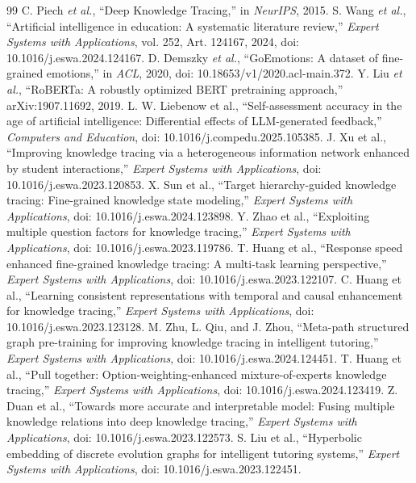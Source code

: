 \documentclass[conference]{IEEEtran}
\begin{document}
\begin{thebibliography}{99}
 C. Piech \emph{et al.}, ``Deep Knowledge Tracing,'' in \emph{NeurIPS}, 2015.
 S. Wang \emph{et al.}, ``Artificial intelligence in education: A systematic literature review,'' \emph{Expert Systems with Applications}, vol. 252, Art. 124167, 2024, doi: 10.1016/j.eswa.2024.124167.
 D. Demszky \emph{et al.}, ``GoEmotions: A dataset of fine-grained emotions,'' in \emph{ACL}, 2020, doi: 10.18653/v1/2020.acl-main.372.
 Y. Liu \emph{et al.}, ``RoBERTa: A robustly optimized BERT pretraining approach,'' arXiv:1907.11692, 2019.
 L. W. Liebenow et al., ``Self-assessment accuracy in the age of artificial intelligence: Differential effects of LLM-generated feedback,'' \emph{Computers and Education}, doi: 10.1016/j.compedu.2025.105385.
 J. Xu et al., ``Improving knowledge tracing via a heterogeneous information network enhanced by student interactions,'' \emph{Expert Systems with Applications}, doi: 10.1016/j.eswa.2023.120853.
 X. Sun et al., ``Target hierarchy-guided knowledge tracing: Fine-grained knowledge state modeling,'' \emph{Expert Systems with Applications}, doi: 10.1016/j.eswa.2024.123898.
 Y. Zhao et al., ``Exploiting multiple question factors for knowledge tracing,'' \emph{Expert Systems with Applications}, doi: 10.1016/j.eswa.2023.119786.
 T. Huang et al., ``Response speed enhanced fine-grained knowledge tracing: A multi-task learning perspective,'' \emph{Expert Systems with Applications}, doi: 10.1016/j.eswa.2023.122107.
 C. Huang et al., ``Learning consistent representations with temporal and causal enhancement for knowledge tracing,'' \emph{Expert Systems with Applications}, doi: 10.1016/j.eswa.2023.123128.
 M. Zhu, L. Qiu, and J. Zhou, ``Meta-path structured graph pre-training for improving knowledge tracing in intelligent tutoring,'' \emph{Expert Systems with Applications}, doi: 10.1016/j.eswa.2024.124451.
 T. Huang et al., ``Pull together: Option-weighting-enhanced mixture-of-experts knowledge tracing,'' \emph{Expert Systems with Applications}, doi: 10.1016/j.eswa.2024.123419.
 Z. Duan et al., ``Towards more accurate and interpretable model: Fusing multiple knowledge relations into deep knowledge tracing,'' \emph{Expert Systems with Applications}, doi: 10.1016/j.eswa.2023.122573.
 S. Liu et al., ``Hyperbolic embedding of discrete evolution graphs for intelligent tutoring systems,'' \emph{Expert Systems with Applications}, doi: 10.1016/j.eswa.2023.122451.

\end{thebibliography}
\end{document}
